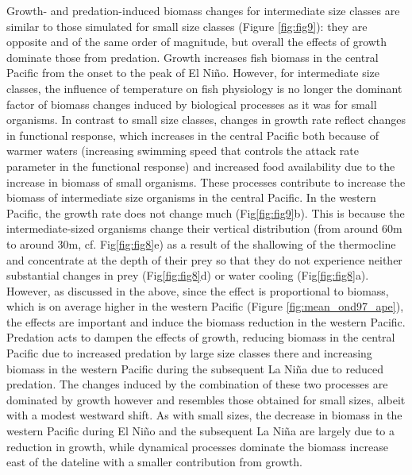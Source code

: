 Growth- and predation-induced biomass changes for intermediate size classes are similar to those simulated for small size classes (Figure \ref{fig:fig9}): they are opposite and of the same order of magnitude, but overall the effects of growth dominate those from predation. Growth increases fish biomass in the central Pacific from the onset to the peak of El Niño. However, for intermediate size classes, the influence of temperature on fish physiology is no longer the dominant factor of biomass changes induced by biological processes as it was for small organisms. In contrast to small size classes, changes in growth rate reflect changes in functional response, which increases in the central Pacific both because of warmer waters (increasing swimming speed that controls the attack rate parameter in the functional response) and increased food availability due to the increase in biomass of small organisms. These processes contribute to increase the biomass of intermediate size organisms in the central Pacific. In the western Pacific, the growth rate does not change much (Fig\ref{fig:fig9}b). This is because the intermediate-sized organisms change their vertical distribution (from around 60m to around 30m, cf. Fig\ref{fig:fig8}e) as a result of the shallowing of the thermocline and concentrate at the depth of their prey so that they do not experience neither substantial changes in prey  (Fig\ref{fig:fig8}d) or water cooling (Fig\ref{fig:fig8}a). However, as discussed in the above, since the effect is proportional to biomass, which is on average higher in the western Pacific (Figure \ref{fig:mean_ond97_ape}), the effects are important and induce the biomass reduction in the western Pacific.
Predation acts to dampen the effects of growth, reducing biomass in the central Pacific due to increased predation by large size classes there and increasing biomass in the western Pacific during the subsequent La Niña due to reduced predation. The changes induced by the combination of these two processes are dominated by growth however and resembles those obtained for small sizes, albeit with a modest westward shift. As with small sizes, the decrease in biomass in the western Pacific during El Niño and the subsequent La Niña are largely due to a reduction in growth, while dynamical processes dominate the biomass increase east of the dateline with a smaller contribution from growth.

